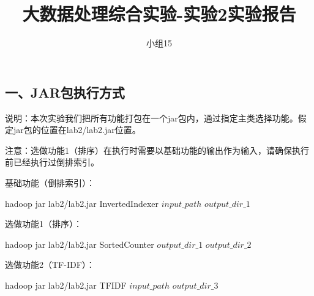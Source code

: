 \documentclass[a4paper,UTF8]{article}
\theoremstyle{definition}
\begin{document}
\begin{CJK}{UTF8}{gkai}
\title{大数据处理综合实验-实验2实验报告}
\author{
    小组15
}
\date{}
\maketitle

\begin{CJK*}{UTF8}{gbsn}
\section*{一、JAR包执行方式}
\end{CJK*}
	\par 说明：本次实验我们把所有功能打包在一个jar包内，通过指定主类选择功能。假定jar包的位置在lab2/lab2.jar位置。
	\par 注意：选做功能1（排序）在执行时需要以基础功能的输出作为输入，请确保执行前已经执行过倒排索引。
	\par 基础功能（倒排索引）：
	\par hadoop jar lab2/lab2.jar InvertedIndexer $input\_path$ $output\_dir\_1$
	\par 选做功能1（排序）：
	\par hadoop jar lab2/lab2.jar SortedCounter $output\_dir\_1$ $output\_dir\_2$
	\par 选做功能2（TF-IDF）：
	\par hadoop jar lab2/lab2.jar TFIDF $input\_path$ $output\_dir\_3$

\begin{CJK*}{UTF8}{gbsn}

\end{CJK*}
\end{CJK}
\end{document}
